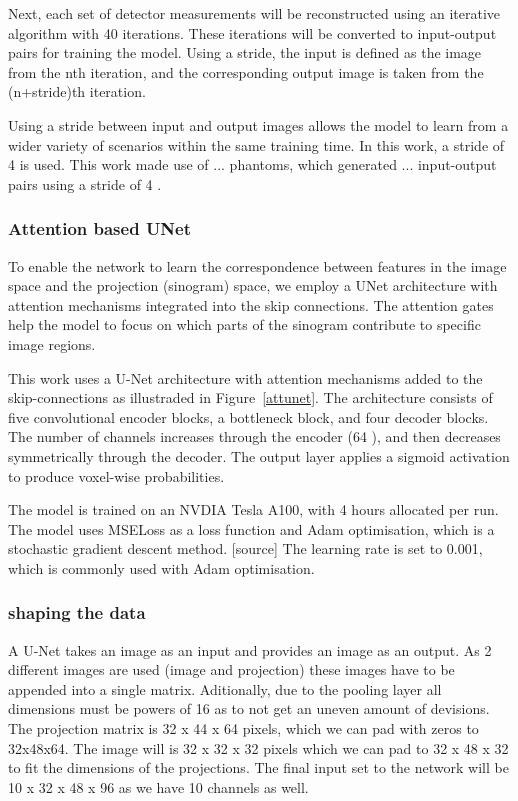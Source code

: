 \documentclass{article}
\begin{document}
Next, each set of detector measurements will be reconstructed using an iterative algorithm with 40 iterations. These iterations will be converted to input-output pairs for training the model. Using a stride, the input is defined as the image from the nth iteration, and the corresponding output image is taken from the (n+stride)th iteration.

Using a stride between input and output images allows the model to learn from a wider variety of scenarios within the same training time. In this work, a stride of 4 is used. This work made use of ... phantoms, which generated ... input-output pairs using a stride of 4 .

\subsubsection{Attention based UNet}

To enable the network to learn the correspondence between features in the image space and the projection (sinogram) space, we employ a UNet architecture with attention mechanisms integrated into the skip connections. The attention gates help the model to focus on which parts of the sinogram contribute to specific image regions.

This work uses a U-Net architecture with attention mechanisms added to the skip-connections as illustraded in Figure~\ref{attunet}. The architecture consists of five convolutional encoder blocks, a bottleneck block, and four decoder blocks. The number of channels increases through the encoder (64    ), and then decreases symmetrically through the decoder. The output layer applies a sigmoid activation to produce voxel-wise probabilities.

The model is trained on an NVDIA Tesla A100, with 4 hours allocated per run. The model uses MSELoss as a loss function and Adam optimisation, which is a stochastic gradient descent method. [source] The learning rate is set to 0.001, which is commonly used with Adam optimisation.

\subsubsection{shaping the data}

A U-Net takes an image as an input and provides an image as an output. As 2 different images are used (image and projection) these images have to be appended into a single matrix. Aditionally, due to the pooling layer all dimensions must be powers of 16 as to not get an uneven amount of devisions. The projection matrix is 32 x 44 x 64 pixels, which we can pad with zeros to 32x48x64. The image will is 32 x 32 x 32 pixels which we can pad to 32 x 48 x 32 to fit the dimensions of the projections. The final input set to the network will be 10 x 32 x 48 x 96 as we have 10 channels as well.
\end{document}
